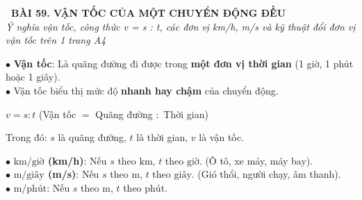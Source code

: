 \documentclass[14pt,a4paper,oneside]{extbook}
\begin{document}
\noindent
\begin{tcolorbox}[
  enhanced,
  colback=teal!8!white,
  colframe=teal!80!black,
  arc=3mm,
  boxrule=1.1pt,
  width=\linewidth,
  halign=center,
  top=2.2mm, bottom=2.2mm,
  left=3mm, right=3mm,
  drop fuzzy shadow
]
  {\large\bfseries\color{teal!95!black}\faBookmark\ BÀI 59. VẬN TỐC CỦA MỘT CHUYỂN ĐỘNG ĐỀU}\\[2pt]
  {\scriptsize\color{black!75}\itshape Ý nghĩa vận tốc, công thức v = s : t, các đơn vị km/h, m/s và kỹ thuật đổi đơn vị vận tốc trên 1 trang A4}
\end{tcolorbox}

\vspace{3.2mm}
\noindent
\begin{minipage}[t]{0.56\textwidth}
  \begin{tcolorbox}[
    enhanced,
    title={\footnotesize\bfseries\color{white}\faTachometer\ 1. Khái niệm và công thức Vận tốc},
    colback=blue!2!white,
    colframe=blue!75!black,
    arc=2.5mm, boxrule=0.8pt, top=1.8mm, bottom=1.8mm, left=2.2mm, right=2.2mm
  ]
    \footnotesize
    $\bullet$ \textbf{Vận tốc}: Là quãng đường đi được trong \textbf{một đơn vị thời gian} (1 giờ, 1 phút hoặc 1 giây).\\
    $\bullet$ Vận tốc biểu thị mức độ \textbf{nhanh hay chậm} của chuyển động.\\
    \begin{tcolorbox}[colback=white, colframe=blue!75!black, boxrule=0.6pt, arc=1.5mm, halign=center, top=1.2mm, bottom=1.2mm]
      {\scriptsize\bfseries\color{blue!90!black}$v = s : t$} \quad (Vận tốc $=$ Quãng đường $:$ Thời gian)
    \end{tcolorbox}
    Trong đó: $s$ là quãng đường, $t$ là thời gian, $v$ là vận tốc.
  \end{tcolorbox}
\end{minipage}%
\hfill
\begin{minipage}[t]{0.42\textwidth}
  \begin{tcolorbox}[
    enhanced,
    title={\footnotesize\bfseries\color{white}\faFlagCheckered\ 2. Các đơn vị vận tốc},
    colback=teal!2!white,
    colframe=teal!75!black,
    arc=2.5mm, boxrule=0.8pt, top=1.8mm, bottom=1.8mm, left=2mm, right=2mm
  ]
    \footnotesize
    $\bullet$ \textbf{$\text{km/giờ}$ (km/h)}: Nếu $s$ theo $\text{km}$, $t$ theo $\text{giờ}$. (Ô tô, xe máy, máy bay).\\
    $\bullet$ \textbf{$\text{m/giây}$ (m/s)}: Nếu $s$ theo $\text{m}$, $t$ theo $\text{giây}$. (Gió thổi, người chạy, âm thanh).\\
    $\bullet$ \textbf{$\text{m/phút}$}: Nếu $s$ theo $\text{m}$, $t$ theo $\text{phút}$.
  \end{tcolorbox}
\end{minipage}
\end{document}
